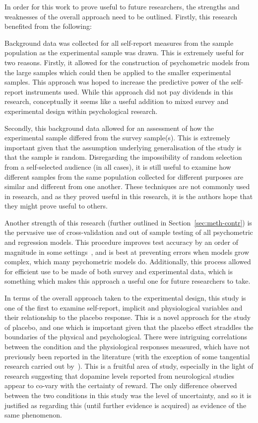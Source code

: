 In order for this work to prove useful to future researchers, the strengths and weaknesses of the overall approach need to be outlined. Firstly, this research benefited from the following:


Background data was collected for all self-report measures from the sample population as the experimental sample was drawn. This is extremely useful for two reasons. Firstly, it allowed for the construction of psychometric models from the large samples which could then be applied to the smaller experimental samples. This approach was hoped to increase the predictive power of the self-report instruments used. While this approach did not pay dividends in this research, conceptually it seems like a useful addition to mixed survey and experimental design within psychological research. 

Secondly, this background data allowed for an assessment of how the experimental sample differed from the survey sample(s). This is extremely important given that the assumption underlying generalisation of the study is that the sample is random. Disregarding the impossibility of random selection from a self-selected audience (in all cases), it is still useful to examine how different samples from the same population collected for different purposes are similar and different from one another. These techniques are not commonly used in research, and as they proved useful in this research, it is the authors hope that they might prove useful to others. 

Another strength of this research (further outlined in Section~\ref{sec:meth-contr}) is the pervasive use of cross-validation and out of sample testing of all psychometric and regression models. This procedure improves test accuracy by an order of magnitude in some settings~\cite{friedman2009elements}, and is best at preventing errors when models grow complex, which many psychometric models do. Additionally, this process allowed for efficient use to be made of both survey and experimental data, which is something which makes this approach a useful one for future researchers to take. 

In terms of the overall approach taken to the experimental design, this study is one of the first to examine self-report, implicit and physiological variables and their relationship to the placebo response. This is a novel approach for the study of placebo, and one which is important given that the placebo effect straddles the boundaries of the physical and psychological. There were intriguing correlations between the condition and the physiological responses measured, which have not previously been reported in the literature (with the exception of some tangential research carried out by~\cite{Fujita2000}). This is a fruitful area of study, especially in the light of research suggesting that dopamine levels reported from neurological studies appear to co-vary with the certainty of reward. The only difference observed between the two conditions in this study was the level of uncertainty, and so it is justified as regarding this (until further evidence is acquired) as evidence of the same phenomenon. 

